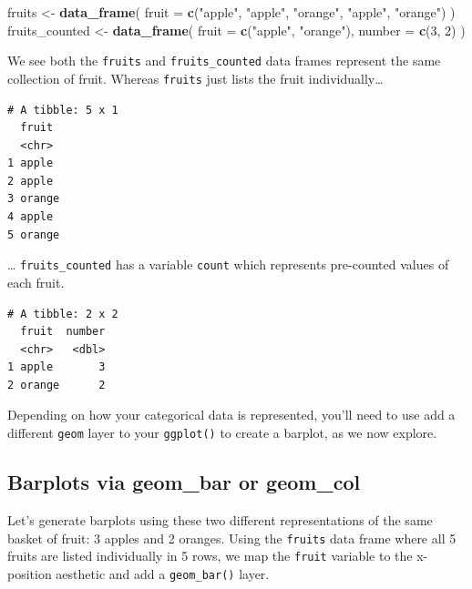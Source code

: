\documentclass[12pt, krantz2,]{krantz}
\makeatletter
\newenvironment{Shaded}{\begin{snugshade}}{\end{snugshade}}
\newcommand{\DataTypeTok}[1]{\textcolor[rgb]{0.27,0.27,0.27}{#1}}
\newcommand{\DecValTok}[1]{\textcolor[rgb]{0.06,0.06,0.06}{#1}}
\newcommand{\KeywordTok}[1]{\textcolor[rgb]{0.27,0.27,0.27}{\textbf{#1}}}
\newcommand{\NormalTok}[1]{#1}
\newcommand{\StringTok}[1]{\textcolor[rgb]{0.5,0.5,0.5}{#1}}
\newenvironment{kframe}{%
\medskip{}
\setlength{\fboxsep}{.8em}
 \def\at@end@of@kframe{}%
 \ifinner\ifhmode%
  \def\at@end@of@kframe{\end{minipage}}%
  \begin{minipage}{\columnwidth}%
 \fi\fi%
 \def\FrameCommand##1{\hskip\@totalleftmargin \hskip-\fboxsep
 \colorbox{shadecolor}{##1}\hskip-\fboxsep
     \hskip-\linewidth \hskip-\@totalleftmargin \hskip\columnwidth}%
 \MakeFramed {\advance\hsize-\width
   \@totalleftmargin\z@ \linewidth\hsize
   \@setminipage}}%
 {\par\unskip\endMakeFramed%
 \at@end@of@kframe}
\renewenvironment{Shaded}{\begin{kframe}}{\end{kframe}}
\makeatother
\begin{document}
\begin{Shaded}
\begin{Highlighting}[]
\NormalTok{fruits <-}\StringTok{ }\KeywordTok{data_frame}\NormalTok{(}
  \DataTypeTok{fruit =} \KeywordTok{c}\NormalTok{(}\StringTok{"apple"}\NormalTok{, }\StringTok{"apple"}\NormalTok{, }\StringTok{"orange"}\NormalTok{, }\StringTok{"apple"}\NormalTok{, }\StringTok{"orange"}\NormalTok{)}
\NormalTok{)}
\NormalTok{fruits_counted <-}\StringTok{ }\KeywordTok{data_frame}\NormalTok{(}
  \DataTypeTok{fruit =} \KeywordTok{c}\NormalTok{(}\StringTok{"apple"}\NormalTok{, }\StringTok{"orange"}\NormalTok{),}
  \DataTypeTok{number =} \KeywordTok{c}\NormalTok{(}\DecValTok{3}\NormalTok{, }\DecValTok{2}\NormalTok{)}
\NormalTok{)}
\end{Highlighting}
\end{Shaded}

We see both the \texttt{fruits} and \texttt{fruits\_counted} data frames represent the same collection of fruit. Whereas \texttt{fruits} just lists the fruit individually\ldots{}

\begin{verbatim}
# A tibble: 5 x 1
  fruit 
  <chr> 
1 apple 
2 apple 
3 orange
4 apple 
5 orange
\end{verbatim}

\ldots{} \texttt{fruits\_counted} has a variable \texttt{count} which represents pre-counted values of each fruit.

\begin{verbatim}
# A tibble: 2 x 2
  fruit  number
  <chr>   <dbl>
1 apple       3
2 orange      2
\end{verbatim}

Depending on how your categorical data is represented, you'll need to use add a different \texttt{geom} layer to your \texttt{ggplot()} to create a barplot, as we now explore.

\hypertarget{barplots-via-geom_bar-or-geom_col}{%
\subsection{Barplots via geom\_bar or geom\_col}\label{barplots-via-geom_bar-or-geom_col}}

Let's generate barplots using these two different representations of the same basket of fruit: 3 apples and 2 oranges. Using the \texttt{fruits} data frame where all 5 fruits are listed individually in 5 rows, we map the \texttt{fruit} variable to the x-position aesthetic and add a \texttt{geom\_bar()} layer.
\end{document}
